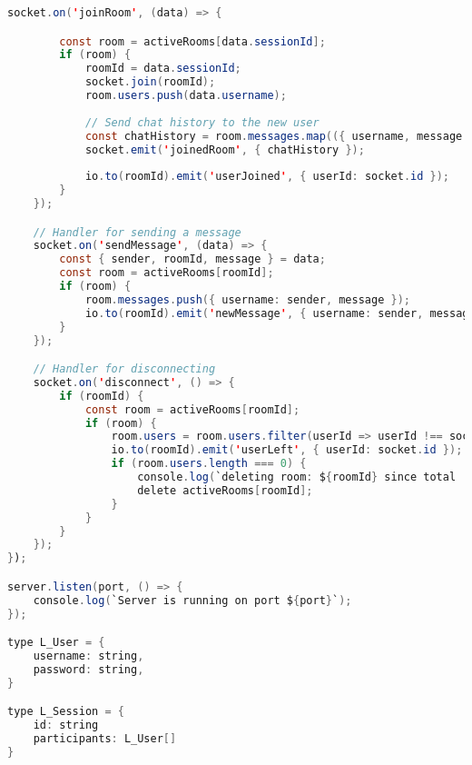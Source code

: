 \begin{lstlisting}[language=Java, caption={Express Backend Server}, label={lst:java}]
    socket.on('joinRoom', (data) => {

        const room = activeRooms[data.sessionId];
        if (room) {
            roomId = data.sessionId;
            socket.join(roomId);
            room.users.push(data.username);
            
            // Send chat history to the new user
            const chatHistory = room.messages.map(({ username, message }) => ({ username: username, message }));
            socket.emit('joinedRoom', { chatHistory });
            
            io.to(roomId).emit('userJoined', { userId: socket.id });
        }
    });

    // Handler for sending a message
    socket.on('sendMessage', (data) => {
        const { sender, roomId, message } = data;
        const room = activeRooms[roomId];
        if (room) {
            room.messages.push({ username: sender, message });
            io.to(roomId).emit('newMessage', { username: sender, message });
        }
    });

    // Handler for disconnecting
    socket.on('disconnect', () => {
        if (roomId) {
            const room = activeRooms[roomId];
            if (room) {
                room.users = room.users.filter(userId => userId !== socket.id);
                io.to(roomId).emit('userLeft', { userId: socket.id });
                if (room.users.length === 0) {
                    console.log(`deleting room: ${roomId} since total  users are: ${room.users.length}`)
                    delete activeRooms[roomId];
                }
            }
        }
    });
});

server.listen(port, () => {
    console.log(`Server is running on port ${port}`);
});

type L_User = {
    username: string,
    password: string,
}

type L_Session = {
    id: string
    participants: L_User[]
}

\end{lstlisting}


